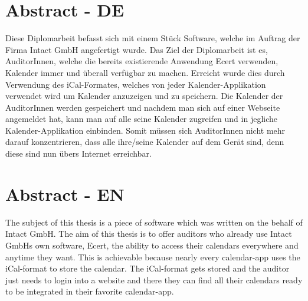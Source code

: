 

\chapter*{Abstract - DE}
\label{cha:abstract}

Diese Diplomarbeit befasst sich mit einem Stück Software, welche im Auftrag der Firma Intact GmbH angefertigt wurde. Das Ziel der Diplomarbeit ist es, AuditorInnen, welche die bereits existierende Anwendung Ecert verwenden, Kalender immer und überall verfügbar zu machen. Erreicht wurde dies durch Verwendung des iCal-Formates, welches von jeder Kalender-Applikation verwendet wird um Kalender anzuzeigen und zu speichern. Die Kalender der AuditorInnen werden gespeichert und nachdem man sich auf einer Webseite angemeldet hat, kann man auf alle seine Kalender zugreifen und in jegliche Kalender-Applikation einbinden. Somit müssen sich AuditorInnen nicht mehr darauf konzentrieren, dass alle ihre/seine Kalender auf dem Gerät sind, denn diese sind nun übers Internet erreichbar. 
\vspace{20px}
\linebreak
\pagebreak

\pagebreak

\chapter*{Abstract - EN}
\label{cha:abstract}
The subject of this thesis is a piece of software which was written on the behalf of Intact GmbH. The aim of this thesis is to offer auditors who already use Intact GmbHs own software, Ecert, the ability to access their calendars everywhere and anytime they want. This is achievable because nearly every calendar-app uses the iCal-format to store the calendar. The iCal-format gets stored and the auditor just needs to login into a website and there they can find all their calendars ready to be integrated in their favorite calendar-app.

